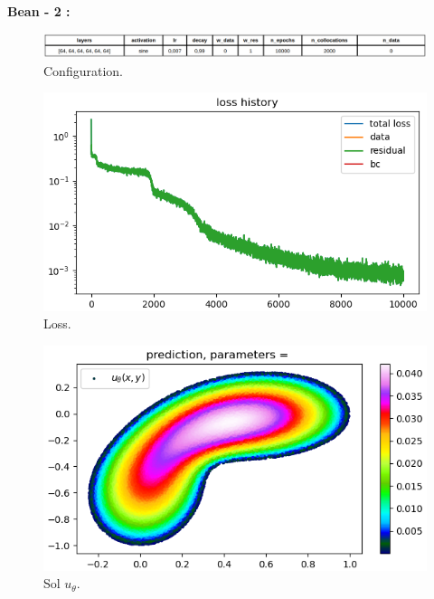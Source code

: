 \documentclass[french]{article}
\begin{document}
	\newpage

	\textbf{Bean - 2 :}
	
	\begin{figure}[H]
		\centering
		\includegraphics[width=\linewidth]{"poisson/bean/config_2.png"}
		\caption{Configuration.}
	\end{figure}
	
	\begin{minipage}{0.48\linewidth}
		\begin{figure}[H]
			\centering
			\includegraphics[width=0.9\linewidth]{"poisson/bean/loss_2.png"}
			\caption{Loss.}
		\end{figure}
	\end{minipage}
	\begin{minipage}{0.48\linewidth}
		\begin{figure}[H]
			\centering
			\includegraphics[width=0.9\linewidth]{"poisson/bean/sol_2.png"}
			\caption{Sol $u_\theta$.}
		\end{figure}
	\end{minipage}
	
\end{document}

